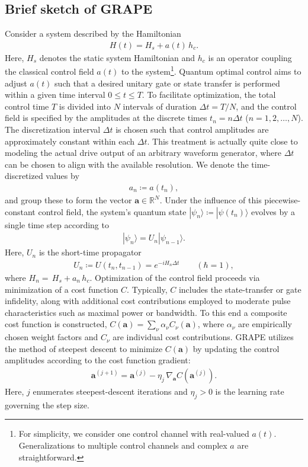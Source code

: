 \documentclass[12pt]{article}
\newcommand{\dket}[1]{|#1\rangle}
\newcommand{\parenthesis}[1]{\left(#1\right)}
\begin{document}
\subsection{Brief sketch of GRAPE}
Consider a system described by the Hamiltonian
\begin{align}
     H(t) = H_s + a(t)\, h_c.
\end{align}
Here, $H_s$ denotes the static system Hamiltonian and $h_c$ is an operator coupling the classical control field $a(t)$ to the system\footnote{For simplicity, we consider one control channel with real-valued $a(t)$. Generalizations to multiple control channels and complex $a$ are straightforward.}. Quantum optimal control aims to adjust $a(t)$ such that a desired unitary gate or state transfer is performed within a given time interval $0\le t \le T$. To facilitate optimization, the total control time $T$ is divided into $N$ intervals of duration $\Delta t=T/N$, and the control field is specified by the amplitudes at the discrete times $t_n=n\Delta t$ ($n=1,2,\dots,N$). The discretization interval $\Delta t$ is chosen such that control amplitudes are approximately constant within each $\Delta t$. This treatment is actually quite close to modeling the actual drive output of an arbitrary waveform generator, where $\Delta t$ can be chosen to align with the available resolution. We denote the time-discretized values by
\begin{align}
\label{eq2}
    a_n \coloneqq a(t_n),
\end{align}
and group these to form the vector $\textbf{a}\in \mathbb{R}^{N}$.  
Under the influence of this piecewise-constant control field, the system's quantum state $\dket{\psi_n}\coloneqq \dket{\psi(t_n)}$ evolves by a single time step according to 
\begin{align}
\label{statepropagation}
  |\psi_n\rangle=U_n|\psi_{n-1}\rangle.
\end{align}
Here, $U_n$ is the short-time propagator
\begin{align}
\label{propagator}
  U_n\coloneqq U(t_n, t_{n-1}) =e^{-iH_n\Delta t}\qquad(\hbar=1),
\end{align}
where $H_n=\, H_s+a_n\, h_c $. Optimization of the control field proceeds via minimization of a cost function $C$. Typically, $C$ includes the state-transfer or gate infidelity, along with additional cost contributions employed to moderate pulse characteristics such as maximal power or bandwidth. To this end a composite cost function is constructed, $C(\textbf{a})=\sum_{\nu}\alpha_\nu C_\nu \parenthesis{\textbf{a}}$, where $\alpha_\nu$ are empirically chosen weight factors and $C_\nu$ are individual cost contributions. GRAPE utilizes the method of steepest descent to minimize $C(\textbf{a})$ by updating the control amplitudes according to the cost function gradient: 
\begin{align}
  \textbf{a}^{(j+1)}=\textbf{a}^{(j)}-\eta_j\,\nabla_{\textbf{a}}C(\textbf{a}^{(j)}).
\end{align}
Here, $j$ enumerates steepest-descent iterations and $\eta_j>0$ is the learning rate governing the step size. 
\end{document}
